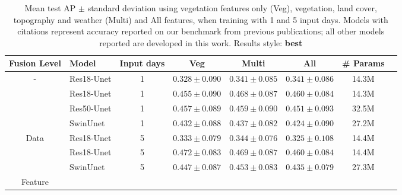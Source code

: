 \begin{table*}[h]
    \centering
    \caption{Mean test AP $\pm$ standard deviation using vegetation features only (Veg), vegetation, land cover, topography and weather (Multi) and All features, when training with 1 and 5 input days. Models with citations represent accuracy reported on our benchmark from previous publications; all other models reported are developed in this work.  Results style: \textbf{best} }
    \begin{tabular}{clcccccc}
        \toprule
        {\textbf{Fusion Level}} & \textbf{Model} & \textbf{Input days} & \textbf{Veg} & \textbf{Multi} & \textbf{All} & \textbf{\# Params} \\
        \midrule
        \multirow{4}{*}{-} & Res18-Unet\cite{gerard2023wildfirespreadts} & 1 & $0.328 \pm 0.090$ & $0.341 \pm 0.085$ & $0.341 \pm 0.086$ & 14.3M \\
                            & Res18-Unet & 1 & ${0.455 \pm 0.090}$ & $\mathbf{0.468 \pm 0.087}$ & $\mathbf{0.460 \pm 0.084}$ & 14.3M \\
                            & Res50-Unet & 1 & $\mathbf{0.457 \pm 0.089}$ & ${0.459 \pm 0.090}$ & ${0.451 \pm 0.093}$ & 32.5M \\
                            & SwinUnet & 1 & $0.432 \pm 0.088$ & $0.437 \pm 0.082$ & $0.424 \pm 0.090$ & 27.2M \\
        \cmidrule{2-7} 
        \multirow{3}{*}{Data} & Res18-Unet\cite{gerard2023wildfirespreadts} & 5 & $0.333 \pm 0.079$ & $0.344 \pm 0.076$ & ${0.325 \pm 0.108}$ & 14.4M \\
                              & Res18-Unet & 5 & $\mathbf{0.472 \pm 0.083}$ & $\mathbf{0.469 \pm 0.087}$ & $\mathbf{0.460 \pm 0.084}$ & 14.4M \\
                              &  SwinUnet & 5 & $0.447 \pm 0.087$ & $0.453 \pm 0.083$ & $0.435 \pm 0.079$ & 27.3M \\
        \cmidrule{2-7} 
        \multirow{4}{*}{Feature} 

\end{tabular}
\end{table*}
